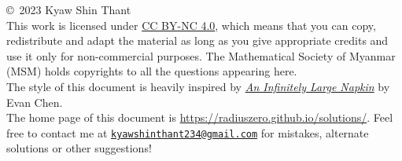 \null\vfill
\noindent \copyright\ 2023 Kyaw Shin Thant
\\[0.4cm]
This work is licensed under
\href{https://creativecommons.org/licenses/by-nc/4.0/}{CC BY-NC 4.0}, which
means that you can copy, redistribute and adapt the material as long as you give
appropriate credits and use it only for non-commercial purposes. The
Mathematical Society of Myanmar (MSM) holds copyrights to all the questions
appearing here.
\\[0.4cm]
The style of this document is heavily inspired by
\href{https://web.evanchen.cc/napkin.html}{\textit{An Infinitely Large Napkin}}
by Evan Chen.
\\[0.4cm]
The home page of this document is
\url{https://radiuszero.github.io/solutions/}. Feel free to contact me at
\href{mailto:kyawshinthant234@gmail.com}{\texttt{kyawshinthant234@gmail.com}}
for mistakes, alternate solutions or other suggestions!


